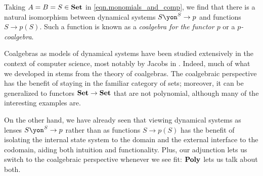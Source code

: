 \documentclass[Book-Poly]{subfiles}
\begin{document}

\begin{example} \label{ex.coalgebras}
Taking $A=B=S\in\mathbf{Set}$ in \eqref{eqn.monomials_and_comp}, we find that there is a natural isomorphism between dynamical systems $S\yon^S\to p$ and functions $S\to p(S)$.
Such a function is known as a \emph{coalgebra for the functor $p$} or a \emph{$p$-coalgebra}.%

Coalgebras as models of dynamical systems have been studied extensively in the context of computer science, most notably by Jacobs in \cite{jacobs2017introduction}.
Indeed, much of what we developed in \label{sec.poly.dyn_sys.moore,sec.poly.dyn_sys.depend_sys} stems from the theory of coalgebras.
The coalgebraic perspective has the benefit of staying in the familiar category of sets; moreover, it can be generalized to functors $\mathbf{Set}\to\mathbf{Set}$ that are not polynomial, although many of the interesting examples are.

On the other hand, we have already seen that viewing dynamical systems as lenses $S\yon^S\to p$ rather than as functions $S\to p(S)$ has the benefit of isolating the internal state system to the domain and the external interface to the codomain, aiding both intuition and functionality.
Plus, our adjunction lets us switch to the coalgebraic perspective whenever we see fit: $\mathbf{Poly}$ lets us talk about both.
\end{example}
\end{document}
